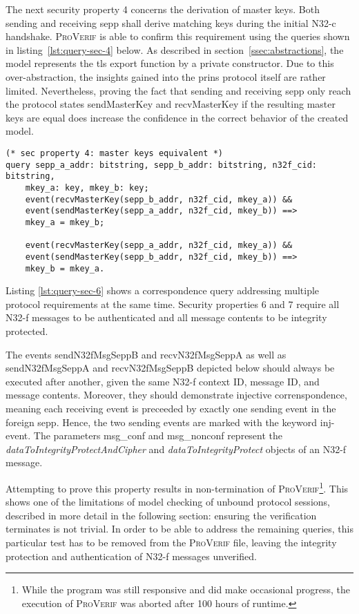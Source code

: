 The next security property 4 concerns the derivation of master keys.
Both sending and receiving \gls{sepp} shall derive matching keys during the initial N32-c handshake.
\textsc{ProVerif} is able to confirm this requirement using the queries shown in listing~\ref{lst:query-sec-4} below.
As described in section~\ref{ssec:abstractions}, the model represents the \gls{tls} export function by a private constructor.
Due to this over-abstraction, the insights gained into the \gls{prins} protocol itself are rather limited.
Nevertheless, proving the fact that sending and receiving \gls{sepp} only reach the protocol states {\sffamily sendMasterKey} and {\sffamily recvMasterKey} if the resulting master keys are equal does increase the confidence in the correct behavior of the created model.

\begin{lstlisting}[caption={Query for security property 4},label={lst:query-sec-4},firstnumber=348]
(* sec property 4: master keys equivalent *)
query sepp_a_addr: bitstring, sepp_b_addr: bitstring, n32f_cid: bitstring,
    mkey_a: key, mkey_b: key;
    event(recvMasterKey(sepp_b_addr, n32f_cid, mkey_a)) &&
    event(sendMasterKey(sepp_a_addr, n32f_cid, mkey_b)) ==>
    mkey_a = mkey_b;

    event(recvMasterKey(sepp_a_addr, n32f_cid, mkey_a)) &&
    event(sendMasterKey(sepp_b_addr, n32f_cid, mkey_b)) ==>
    mkey_b = mkey_a.
\end{lstlisting}

Listing \ref{lst:query-sec-6} shows a correspondence query addressing multiple protocol requirements at the same time.
Security properties 6 and 7 require all N32-f messages to be authenticated and all message contents to be integrity protected.

The events {\sffamily sendN32fMsgSeppB} and {\sffamily recvN32fMsgSeppA} as well as {\sffamily sendN32fMsgSeppA} and {\sffamily recvN32fMsgSeppB} depicted below should always be executed after another, given the same N32-f context ID, message ID, and message contents.
Moreover, they should demonstrate injective correnspondence, meaning each receiving event is preceeded by exactly one sending event in the foreign \gls{sepp}.
Hence, the two sending events are marked with the keyword {\sffamily inj-event}.
The parameters {\sffamily msg\_conf} and {\sffamily msg\_nonconf} represent the \textit{dataToIntegrityProtectAndCipher} and \textit{dataToIntegrityProtect} objects of an N32-f message.

Attempting to prove this property results in non-termination of \textsc{ProVerif}\footnote{While the program was still responsive and did make occasional progress, the execution of \textsc{ProVerif} was aborted after 100 hours of runtime.}.
This shows one of the limitations of model checking of unbound protocol sessions, described in more detail in the following section: ensuring the verification terminates is not trivial.
In order to be able to address the remaining queries, this particular test has to be removed from the \textsc{ProVerif} file, leaving the integrity protection and authentication of N32-f messages unverified.

